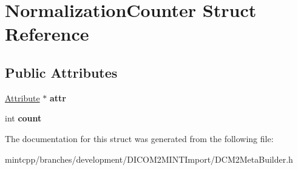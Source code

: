 \hypertarget{struct_normalization_counter}{
\section{NormalizationCounter Struct Reference}
\label{struct_normalization_counter}
}
\subsection*{Public Attributes}
\begin{DoxyCompactItemize}
\item 
\hypertarget{struct_normalization_counter_aa6db04966b5b7a8007363d200e90f7f7}{
\hyperlink{class_attribute}{Attribute} $\ast$ {\bfseries attr}}
\label{struct_normalization_counter_aa6db04966b5b7a8007363d200e90f7f7}

\item 
\hypertarget{struct_normalization_counter_a324508914786d3c6ffb81e084e9cec83}{
int {\bfseries count}}
\label{struct_normalization_counter_a324508914786d3c6ffb81e084e9cec83}

\end{DoxyCompactItemize}


The documentation for this struct was generated from the following file:\begin{DoxyCompactItemize}
\item 
mintcpp/branches/development/DICOM2MINTImport/DCM2MetaBuilder.h\end{DoxyCompactItemize}
